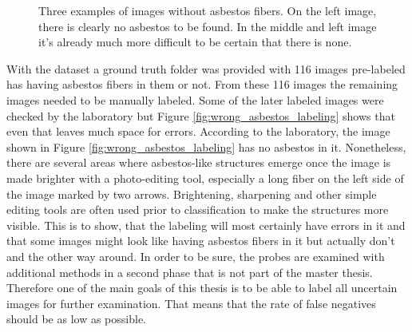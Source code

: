 \begin{figure}[h]
\centering
\caption{Three examples of images without asbestos fibers. On the left image, there is clearly no asbestos to be found. In the middle and left image it's already much more difficult to be certain that there is none.}
\label{fig:non-asbestos_examples}
\end{figure}

With the dataset a ground truth folder was provided with 116 images pre-labeled has having asbestos fibers in them or not. From these 116 images the remaining images needed to be manually labeled. Some of the later labeled images were checked by the laboratory but Figure \ref{fig:wrong_asbestos_labeling} shows that even that leaves much space for errors.  According to the laboratory, the image shown in Figure \ref{fig:wrong_asbestos_labeling} has no asbestos in it. Nonetheless, there are several areas where asbestos-like structures emerge once the image is made brighter with a photo-editing tool, especially a long fiber on the left side of the image marked by two arrows. Brightening, sharpening and other simple editing tools are often used prior to classification to make the structures more visible. This is to show, that the labeling will most certainly have errors in it and that some images might look like having asbestos fibers in it but actually don't and the other way around. In order to be sure, the probes are examined with additional methods in a second phase that is not part of the master thesis. Therefore one of the main goals of this thesis is to be able to label all uncertain images for further examination. That means that the rate of false negatives should be as low as possible.

